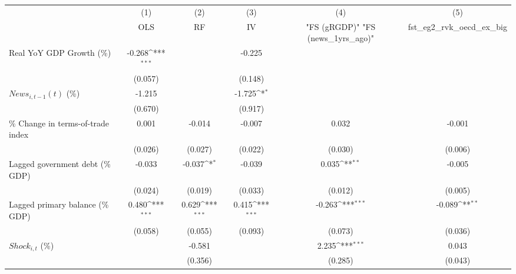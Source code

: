{
\def\sym#1{\ifmmode^{#1}\else\(^{#1}\)\fi}
\begin{tabular}{l*{5}{c}}
\toprule
                    &\multicolumn{1}{c}{(1)}&\multicolumn{1}{c}{(2)}&\multicolumn{1}{c}{(3)}&\multicolumn{1}{c}{(4)}&\multicolumn{1}{c}{(5)}\\
                    &\multicolumn{1}{c}{OLS}&\multicolumn{1}{c}{RF}&\multicolumn{1}{c}{IV}&\multicolumn{1}{c}{ "FS (gRGDP)"  "FS (news_1yrs_ago)" }&\multicolumn{1}{c}{fst_eg2_rvk_oecd_ex_big}\\
\midrule
Real YoY GDP Growth (\%)&      -0.268\sym{***}&                     &      -0.225         &                     &                     \\
                    &     (0.057)         &                     &     (0.148)         &                     &                     \\
\addlinespace
$ News_{i,t-1}(t)$ (\%)&      -1.215         &                     &      -1.725\sym{*}  &                     &                     \\
                    &     (0.670)         &                     &     (0.917)         &                     &                     \\
\addlinespace
\% Change in terms-of-trade index&       0.001         &      -0.014         &      -0.007         &       0.032         &      -0.001         \\
                    &     (0.026)         &     (0.027)         &     (0.022)         &     (0.030)         &     (0.006)         \\
\addlinespace
Lagged government debt (\% GDP)&      -0.033         &      -0.037\sym{*}  &      -0.039         &       0.035\sym{**} &      -0.005         \\
                    &     (0.024)         &     (0.019)         &     (0.033)         &     (0.012)         &     (0.005)         \\
\addlinespace
Lagged primary balance (\% GDP)&       0.480\sym{***}&       0.629\sym{***}&       0.415\sym{***}&      -0.263\sym{***}&      -0.089\sym{**} \\
                    &     (0.058)         &     (0.055)         &     (0.093)         &     (0.073)         &     (0.036)         \\
\addlinespace
$ Shock_{i,t}$ (\%) &                     &      -0.581         &                     &       2.235\sym{***}&       0.043         \\
                    &                     &     (0.356)         &                     &     (0.285)         &     (0.043)         \\

\end{tabular}}
